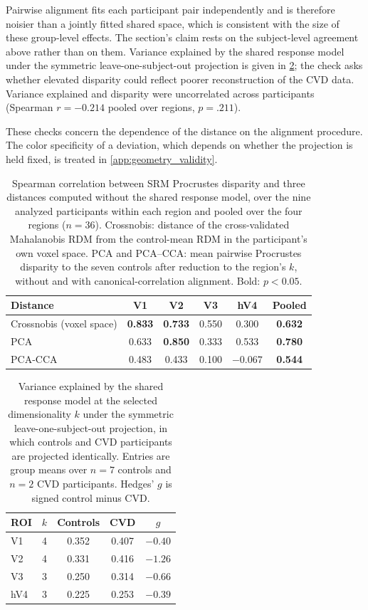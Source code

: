 Pairwise alignment fits each participant pair independently and is therefore noisier than a jointly fitted shared space, which is consistent with the size of these group-level effects. The section's claim rests on the subject-level agreement above rather than on them.
Variance explained by the shared response model under the symmetric leave-one-subject-out projection is given in \cref{tab:variance_explained}; the check asks whether elevated disparity could reflect poorer reconstruction of the CVD data. Variance explained and disparity were uncorrelated across participants (Spearman $r = -0.214$ pooled over regions, $p = .211$).

These checks concern the dependence of the distance on the alignment procedure. The color specificity of a deviation, which depends on whether the projection is held fixed, is treated in \cref{app:geometry_validity}.

\begin{table}[h]
\centering
\caption{Spearman correlation between SRM Procrustes disparity and three distances computed without the shared response model, over the nine analyzed participants within each region and pooled over the four regions ($n = 36$). Crossnobis: distance of the cross-validated Mahalanobis RDM from the control-mean RDM in the participant's own voxel space. PCA and PCA--CCA: mean pairwise Procrustes disparity to the seven controls after reduction to the region's $k$, without and with canonical-correlation alignment. Bold: $p < 0.05$.}
\label{tab:triangulation}
\begin{tabular}{lccccc}
\toprule
Distance & V1 & V2 & V3 & hV4 & Pooled \\
\midrule
Crossnobis (voxel space) & \textbf{0.833} & \textbf{0.733} & 0.550 & 0.300 & \textbf{0.632} \\
PCA                      & 0.633 & \textbf{0.850} & 0.333 & 0.533 & \textbf{0.780} \\
PCA-CCA                  & 0.483 & 0.433 & 0.100 & $-0.067$ & \textbf{0.544} \\
\bottomrule
\end{tabular}
\end{table}

\begin{table}[h]
\centering
\caption{Variance explained by the shared response model at the selected dimensionality $k$ under the symmetric leave-one-subject-out projection, in which controls and CVD participants are projected identically. Entries are group means over $n = 7$ controls and $n = 2$ CVD participants. Hedges' $g$ is signed control minus CVD.}
\label{tab:variance_explained}
\begin{tabular}{lcccc}
\toprule
ROI & $k$ & Controls & CVD & $g$ \\
\midrule
V1  & 4 & 0.352 & 0.407 & $-0.40$ \\
V2  & 4 & 0.331 & 0.416 & $-1.26$ \\
V3  & 3 & 0.250 & 0.314 & $-0.66$ \\
hV4 & 3 & 0.225 & 0.253 & $-0.39$ \\
\bottomrule
\end{tabular}
\end{table}

